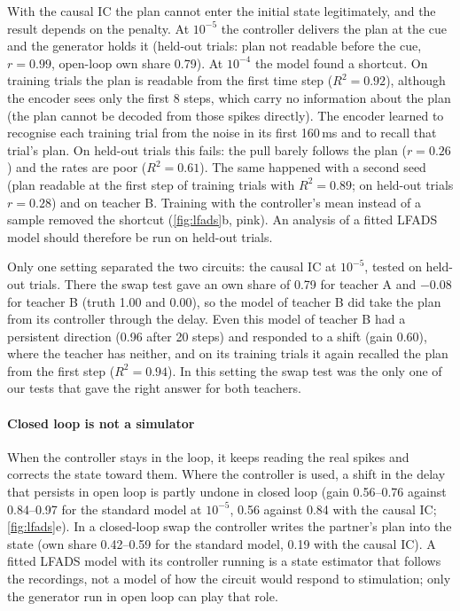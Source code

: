 \documentclass[11pt,a4paper]{article}
\begin{document}
With the causal IC the plan cannot enter the initial state legitimately, and the result depends on the penalty. At $10^{-5}$ the controller delivers the plan at the cue and the generator holds it (held-out trials: plan not readable before the cue, $r=0.99$, open-loop own share 0.79). At $10^{-4}$ the model found a shortcut. On training trials the plan is readable from the first time step ($R^2=0.92$), although the encoder sees only the first 8 steps, which carry no information about the plan (the plan cannot be decoded from those spikes directly). The encoder learned to recognise each training trial from the noise in its first 160\,ms and to recall that trial's plan. On held-out trials this fails: the pull barely follows the plan ($r=0.26$) and the rates are poor ($R^2=0.61$). The same happened with a second seed (plan readable at the first step of training trials with $R^2=0.89$; on held-out trials $r=0.28$) and on teacher B. Training with the controller's mean instead of a sample removed the shortcut (\cref{fig:lfads}b, pink). An analysis of a fitted LFADS model should therefore be run on held-out trials.

Only one setting separated the two circuits: the causal IC at $10^{-5}$, tested on held-out trials. There the swap test gave an own share of 0.79 for teacher A and $-0.08$ for teacher B (truth 1.00 and 0.00), so the model of teacher B did take the plan from its controller through the delay. Even this model of teacher B had a persistent direction (0.96 after 20 steps) and responded to a shift (gain 0.60), where the teacher has neither, and on its training trials it again recalled the plan from the first step ($R^2=0.94$). In this setting the swap test was the only one of our tests that gave the right answer for both teachers.

\paragraph{Closed loop is not a simulator} When the controller stays in the loop, it keeps reading the real spikes and corrects the state toward them. Where the controller is used, a shift in the delay that persists in open loop is partly undone in closed loop (gain 0.56--0.76 against 0.84--0.97 for the standard model at $10^{-5}$, 0.56 against 0.84 with the causal IC; \cref{fig:lfads}e). In a closed-loop swap the controller writes the partner's plan into the state (own share 0.42--0.59 for the standard model, 0.19 with the causal IC). A fitted LFADS model with its controller running is a state estimator that follows the recordings, not a model of how the circuit would respond to stimulation; only the generator run in open loop can play that role.
\end{document}
